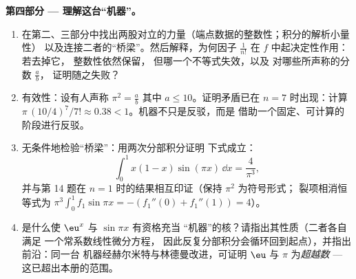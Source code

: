 \begin{problem}
\medskip
\noindent\textbf{第四部分 --- 理解这台“机器”。}
\begin{enumerate}[resume]
  \item 在第二、三部分中找出两股对立的力量（端点数据的整数性；积分的解析小量性）
        以及连接二者的“桥梁”。然后解释，为何因子
        $\frac{1}{n!}$ 在 $f$ 中起决定性作用：若去掉它，
        整数性依然保留，
        但哪一个不等式失效，以及
        对哪些所声称的分数 $\frac ab$，
        证明随之失败？
  \item 有效性：设有人声称 $\pi^2 = \frac ab$
        其中 $a \leq 10$。证明矛盾已在
        $n = 7$ 时出现：计算 $\pi\,(10/4)^7/7! \approx
        0.38 < 1$。机器不只是反驳，而是
        借助一个固定、可计算的阶段进行反驳。
  \item 无条件地检验“桥梁”：用两次分部积分证明
        下式成立：
        \[
        \int_0^1 x(1 - x)\sin(\pi x)\,\dd x = \frac{4}{\pi^3},
        \]
        并与第 14 题在 $n = 1$ 时的结果相互印证（保持 $\pi^2$ 为符号形式；
        裂项相消恒等式为 $\pi^3
        \int_0^1 f_1 \sin \pi x = -(f_1''(0) + f_1''(1)) = 4$）。
  \item 是什么使 $\eu^x$ 与 $\sin \pi x$ 有资格充当
        “机器”的核？请指出其性质（二者各自满足
        一个常系数线性微分方程，
        因此反复分部积分会循环回到起点），并指出前沿：同一台
        机器经赫尔米特与林德曼改进，可证明
        $\eu$ 与 $\pi$ 为\emph{超越数}
        --- 这已超出本册的范围。
\end{enumerate}


\end{problem}
